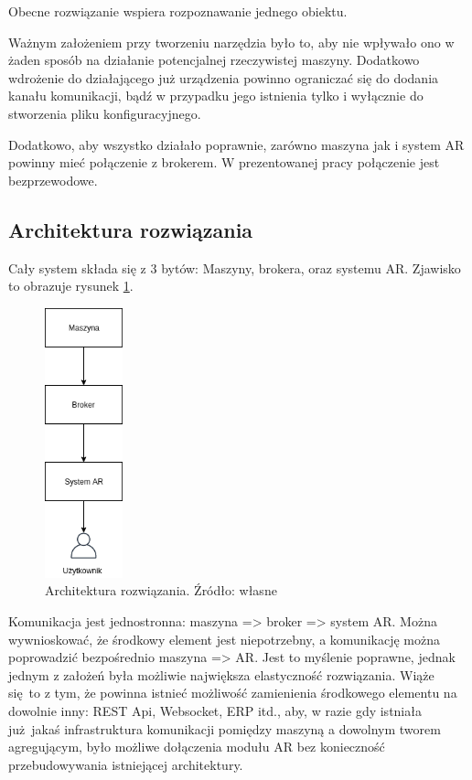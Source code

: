 \documentclass[12pt,twoside,polish]{article}
\begin{document}
Obecne rozwiązanie wspiera rozpoznawanie jednego obiektu.

Ważnym założeniem przy tworzeniu narzędzia było to, aby nie wpływało ono w żaden sposób na działanie potencjalnej rzeczywistej maszyny. Dodatkowo wdrożenie do działającego już urządzenia powinno ograniczać się do dodania kanału komunikacji, bądź w przypadku jego istnienia tylko i wyłącznie do stworzenia pliku konfiguracyjnego.

Dodatkowo, aby wszystko działało poprawnie, zarówno maszyna jak i system AR powinny mieć połączenie z brokerem. W prezentowanej pracy połączenie jest bezprzewodowe.

\subsection{Architektura rozwiązania}
Cały system składa się z 3 bytów: Maszyny, brokera, oraz systemu AR. Zjawisko to obrazuje rysunek \ref{arch}.

\begin{figure}[h]
	\centering	
	\includegraphics[width=0.2\textwidth]{architektura}
	\caption{Architektura rozwiązania. Źródło: własne}
	\label{arch}
\end{figure}
Komunikacja jest jednostronna: maszyna => broker => system AR. Można wywnioskować, że środkowy element jest niepotrzebny, a komunikację można poprowadzić bezpośrednio maszyna => AR. Jest to myślenie poprawne, jednak jednym z założeń była możliwie największa elastyczność rozwiązania. Wiąże się to z tym, że powinna istnieć możliwość zamienienia środkowego elementu na dowolnie inny: REST Api, Websocket, ERP itd., aby, w razie gdy istniała już jakaś infrastruktura komunikacji pomiędzy maszyną a dowolnym tworem agregującym, było możliwe dołączenia modułu AR bez konieczność przebudowywania istniejącej architektury.
\end{document}
